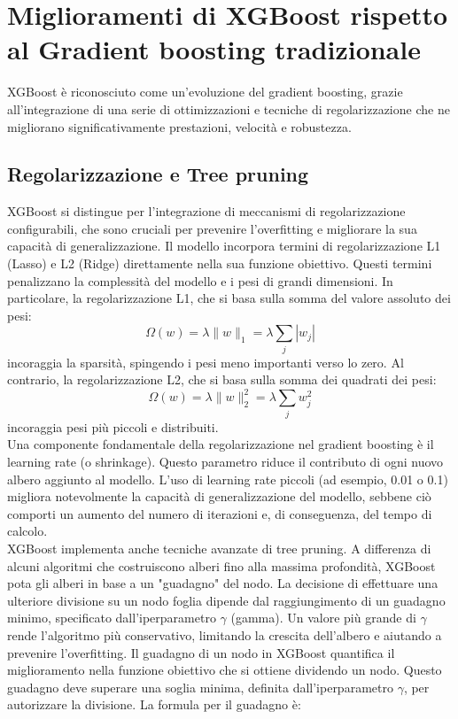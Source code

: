 \documentclass[a4paper,12pt]{report}
\begin{document}
	\section{Miglioramenti di XGBoost rispetto al Gradient boosting tradizionale}
	
	XGBoost è riconosciuto come un'evoluzione del gradient boosting, grazie all'integrazione di una serie di ottimizzazioni e tecniche di regolarizzazione che ne migliorano significativamente prestazioni, velocità e robustezza.
	
	\subsection{Regolarizzazione e Tree pruning}
	XGBoost si distingue per l'integrazione di meccanismi di regolarizzazione configurabili, che sono cruciali per prevenire l'overfitting e migliorare la sua capacità di generalizzazione. Il modello incorpora termini di regolarizzazione L1 (Lasso) e L2 (Ridge) direttamente nella sua funzione obiettivo. Questi termini penalizzano la complessità del modello e i pesi di grandi dimensioni. In particolare, la regolarizzazione L1, che si basa sulla somma del valore assoluto dei pesi:
	$$ \Omega(w) = \lambda \|w\|_1 = \lambda \sum_j |w_j| $$
	incoraggia la sparsità, spingendo i pesi meno importanti verso lo zero. Al contrario, la regolarizzazione L2, che si basa sulla somma dei quadrati dei pesi:
	$$ \Omega(w) = \lambda \|w\|_2^2 = \lambda \sum_j w_j^2 $$
	incoraggia pesi più piccoli e distribuiti. \\
	Una componente fondamentale della regolarizzazione nel gradient boosting è il learning rate (o shrinkage). Questo parametro riduce il contributo di ogni nuovo albero aggiunto al modello. L'uso di learning rate piccoli (ad esempio, 0.01 o 0.1) migliora notevolmente la capacità di generalizzazione del modello, sebbene ciò comporti un aumento del numero di iterazioni e, di conseguenza, del tempo di calcolo. \\
	XGBoost implementa anche tecniche avanzate di tree pruning. A differenza di alcuni algoritmi che costruiscono alberi fino alla massima profondità, XGBoost pota gli alberi in base a un "guadagno" del nodo. La decisione di effettuare una ulteriore divisione su un nodo foglia dipende dal raggiungimento di un guadagno minimo, specificato dall'iperparametro $\gamma$ (gamma). Un valore più grande di $\gamma$ rende l'algoritmo più conservativo, limitando la crescita dell'albero e aiutando a prevenire l'overfitting.
	Il guadagno di un nodo in XGBoost quantifica il miglioramento nella funzione obiettivo che si ottiene dividendo un nodo. Questo guadagno deve superare una soglia minima, definita dall'iperparametro $\gamma$, per autorizzare la divisione. La formula per il guadagno è:
\end{document}
